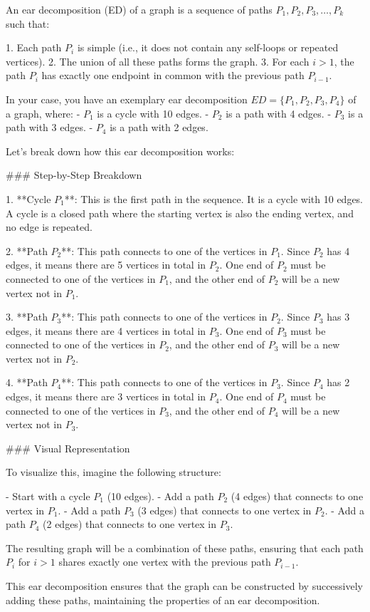 An ear decomposition (ED) of a graph is a sequence of paths \( P_1, P_2, P_3, \ldots, P_k \) such that:

1. Each path \( P_i \) is simple (i.e., it does not contain any self-loops or repeated vertices).
2. The union of all these paths forms the graph.
3. For each \( i > 1 \), the path \( P_i \) has exactly one endpoint in common with the previous path \( P_{i-1} \).

In your case, you have an exemplary ear decomposition \( ED = \{P_1, P_2, P_3, P_4\} \) of a graph, where:
- \( P_1 \) is a cycle with 10 edges.
- \( P_2 \) is a path with 4 edges.
- \( P_3 \) is a path with 3 edges.
- \( P_4 \) is a path with 2 edges.

Let's break down how this ear decomposition works:

### Step-by-Step Breakdown

1. **Cycle \( P_1 \)**: This is the first path in the sequence. It is a cycle with 10 edges. A cycle is a closed path where the starting vertex is also the ending vertex, and no edge is repeated.

2. **Path \( P_2 \)**: This path connects to one of the vertices in \( P_1 \). Since \( P_2 \) has 4 edges, it means there are 5 vertices in total in \( P_2 \). One end of \( P_2 \) must be connected to one of the vertices in \( P_1 \), and the other end of \( P_2 \) will be a new vertex not in \( P_1 \).

3. **Path \( P_3 \)**: This path connects to one of the vertices in \( P_2 \). Since \( P_3 \) has 3 edges, it means there are 4 vertices in total in \( P_3 \). One end of \( P_3 \) must be connected to one of the vertices in \( P_2 \), and the other end of \( P_3 \) will be a new vertex not in \( P_2 \).

4. **Path \( P_4 \)**: This path connects to one of the vertices in \( P_3 \). Since \( P_4 \) has 2 edges, it means there are 3 vertices in total in \( P_4 \). One end of \( P_4 \) must be connected to one of the vertices in \( P_3 \), and the other end of \( P_4 \) will be a new vertex not in \( P_3 \).

### Visual Representation

To visualize this, imagine the following structure:

- Start with a cycle \( P_1 \) (10 edges).
- Add a path \( P_2 \) (4 edges) that connects to one vertex in \( P_1 \).
- Add a path \( P_3 \) (3 edges) that connects to one vertex in \( P_2 \).
- Add a path \( P_4 \) (2 edges) that connects to one vertex in \( P_3 \).

The resulting graph will be a combination of these paths, ensuring that each path \( P_i \) for \( i > 1 \) shares exactly one vertex with the previous path \( P_{i-1} \).

This ear decomposition ensures that the graph can be constructed by successively adding these paths, maintaining the properties of an ear decomposition.